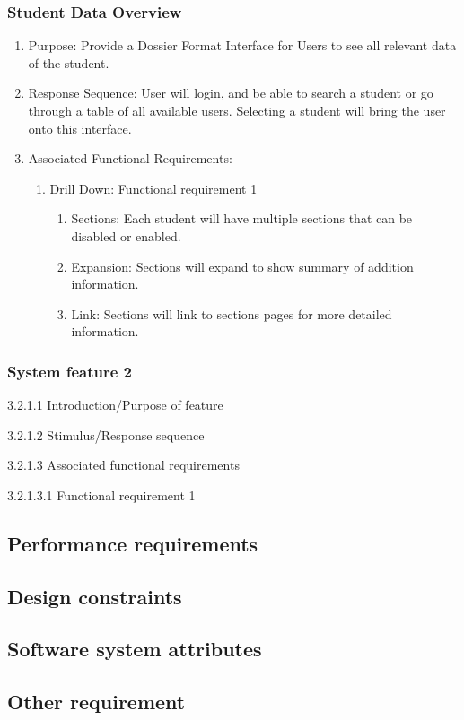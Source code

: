 \documentclass{journal}
\begin{document}
\subsubsection{Student Data Overview}
\begin{enumerate}
\item Purpose: Provide a Dossier Format Interface for Users to see all relevant data of the student.
\item Response Sequence: User will login, and be able to search a student or go through a table of all available users. Selecting a student will bring the user onto this interface.
\item Associated Functional Requirements:
\begin{enumerate}
\item Drill Down: Functional requirement 1
\begin{enumerate}
\item Sections: Each student will have multiple sections that can be disabled or enabled.
\item Expansion: Sections will expand to show summary of addition information.
\item Link: Sections will link to sections pages for more detailed information.
\end{enumerate}
\end{enumerate}
\end{enumerate}
\subsubsection{System feature 2}
\begin{description}

\item{3.2.1.1} Introduction/Purpose of feature
\item{3.2.1.2} Stimulus/Response sequence
\item{3.2.1.3} Associated functional requirements
\begin{description}
\item{3.2.1.3.1} Functional requirement 1
\end{description}
\end{description}

\subsection{Performance requirements}
\subsection{Design constraints}
\subsection{Software system attributes}
\subsection{Other requirement}

\newpage

\end{document}
